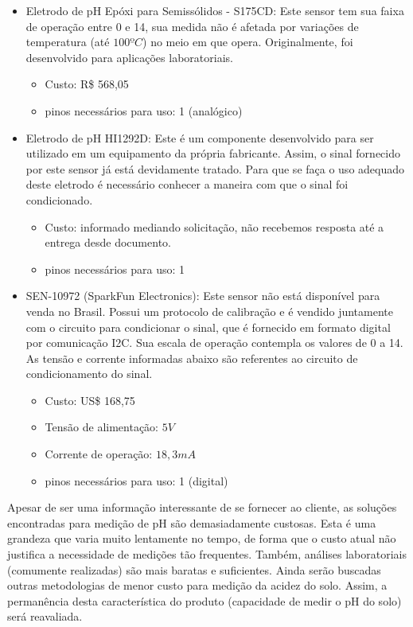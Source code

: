 	\begin{itemize}
		\item Eletrodo de pH Epóxi para Semissólidos - S175CD: Este sensor tem sua faixa de operação  entre 0 e 14, sua medida não é afetada por variações de temperatura (até $100ºC$) no meio em que opera. Originalmente, foi desenvolvido para aplicações laboratoriais. 
		  
		\begin{itemize}
			\item Custo: R\$ 568,05 
			\item pinos necessários para uso: 1 (analógico) 
		\end{itemize}

		\item Eletrodo de pH HI1292D: Este é um componente desenvolvido para ser utilizado em um equipamento da própria fabricante. Assim, o sinal fornecido por este sensor já está devidamente tratado. Para que se faça o uso adequado deste eletrodo é necessário conhecer a maneira com que o sinal foi condicionado.
		\begin{itemize}
			\item Custo: informado mediando solicitação, não recebemos resposta até a entrega desde documento. 
			\item pinos necessários para uso: 1 
		\end{itemize}
		
		\item SEN-10972 (SparkFun Electronics): Este sensor não está disponível para venda no Brasil. Possui um protocolo de calibração e é vendido juntamente com o circuito para condicionar o sinal, que é fornecido em formato digital por comunicação I2C. Sua escala de operação contempla os valores de 0 a 14. As tensão e corrente informadas abaixo são referentes ao circuito de condicionamento do sinal.
		\begin{itemize}
			\item Custo: US\$ 168,75 
			\item Tensão de alimentação: $5V$
			\item Corrente de operação: $18,3 mA$
			\item pinos necessários para uso: 1 (digital) 
		\end{itemize}


	\end{itemize}
		
	Apesar de ser uma informação interessante de se fornecer ao cliente, as soluções encontradas para medição de pH são demasiadamente custosas. Esta é uma grandeza  que varia muito lentamente no tempo, de forma que o custo atual não justifica a necessidade de medições tão frequentes. Também, análises laboratoriais (comumente realizadas) são mais baratas e suficientes. Ainda serão buscadas outras metodologias de menor custo para medição da acidez do solo. Assim, a permanência desta característica do produto (capacidade de medir o pH do solo) será reavaliada. 	
	
